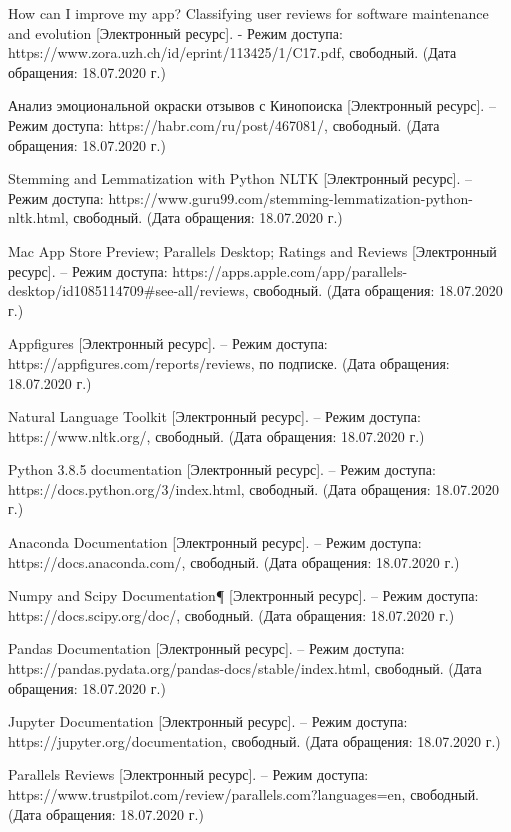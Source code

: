\documentclass[a4paper,12pt]{article}
\begin{document}
	\begin{thebibliography}{9}
		
		 How can I improve my app? Classifying user reviews for software maintenance and evolution [Электронный ресурс]. - Режим доступа: https://www.zora.uzh.ch/id/eprint/113425/1/C17.pdf, свободный. (Дата обращения: 18.07.2020 г.)
		
		 Анализ эмоциональной окраски отзывов с Кинопоиска [Электронный ресурс]. – Режим доступа: https://habr.com/ru/post/467081/, свободный. (Дата обращения: 18.07.2020 г.)
		
		 Stemming and Lemmatization with Python NLTK [Электронный ресурс]. – Режим доступа: https://www.guru99.com/stemming-lemmatization-python-nltk.html, свободный. (Дата обращения: 18.07.2020 г.)
		
		 Mac App Store Preview; Parallels Desktop; Ratings and Reviews
		 [Электронный ресурс]. – Режим доступа: https://apps.apple.com/app/parallels-desktop/id1085114709\#see-all/reviews, свободный. (Дата обращения: 18.07.2020 г.)
		 
		  Appfigures
		 [Электронный ресурс]. – Режим доступа: https://appfigures.com/reports/reviews, по подписке. (Дата обращения: 18.07.2020 г.)
		 
		  Natural Language Toolkit
		 [Электронный ресурс]. – Режим доступа: https://www.nltk.org/, свободный. (Дата обращения: 18.07.2020 г.)
		 
		  Python 3.8.5 documentation
		 [Электронный ресурс]. – Режим доступа: https://docs.python.org/3/index.html, свободный. (Дата обращения: 18.07.2020 г.)
		 
		  Anaconda Documentation
		 [Электронный ресурс]. – Режим доступа: https://docs.anaconda.com/, свободный. (Дата обращения: 18.07.2020 г.)
		 
		  Numpy and Scipy Documentation¶
		 [Электронный ресурс]. – Режим доступа: https://docs.scipy.org/doc/, свободный. (Дата обращения: 18.07.2020 г.)
		 
		  Pandas Documentation
		 [Электронный ресурс]. – Режим доступа: https://pandas.pydata.org/pandas-docs/stable/index.html, свободный. (Дата обращения: 18.07.2020 г.)
		 
		  Jupyter Documentation
		 [Электронный ресурс]. – Режим доступа: https://jupyter.org/documentation, свободный. (Дата обращения: 18.07.2020 г.)
		 
		  Parallels Reviews
		 [Электронный ресурс]. – Режим доступа: https://www.trustpilot.com/review/parallels.com?languages=en, свободный. (Дата обращения: 18.07.2020 г.)
		
	\end{thebibliography}
	
\end{document}
